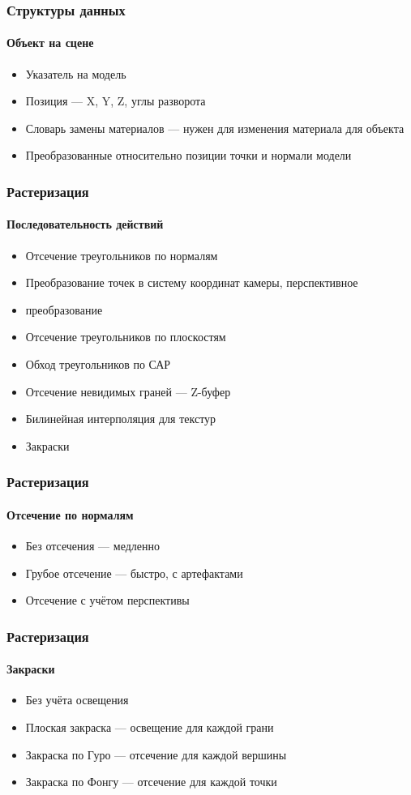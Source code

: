 \documentclass{beamer}
\begin{document}
\begin{frame}
\begin{frame}
\frametitle{Структуры данных}
\framesubtitle{Объект на сцене}

\begin{itemize}
\item Указатель на модель
\item Позиция --- X, Y, Z, углы разворота
\item Словарь замены материалов --- нужен для изменения материала для объекта
\item Преобразованные относительно позиции точки и нормали модели
\end{itemize}
\end{frame}

\begin{frame}
\frametitle{Растеризация}
\framesubtitle{Последовательность действий}

\begin{itemize}
\item Отсечение треугольников по нормалям
\item Преобразование точек в систему координат камеры, перспективное \item преобразование
\item Отсечение треугольников по плоскостям
\item Обход треугольников по САР
\item Отсечение невидимых граней --- Z-буфер
\item Билинейная интерполяция для текстур
\item Закраски
\end{itemize}
\end{frame}

\begin{frame}
\frametitle{Растеризация}
\framesubtitle{Отсечение по нормалям}

\begin{itemize}
\item Без отсечения --- медленно
\item Грубое отсечение --- быстро, с артефактами
\item Отсечение с учётом перспективы
\end{itemize}
\end{frame}

\begin{frame}
\frametitle{Растеризация}
\framesubtitle{Закраски}

\begin{itemize}
\item Без учёта освещения
\item Плоская закраска --- освещение для каждой грани
\item Закраска по Гуро --- отсечение для каждой вершины
\item Закраска по Фонгу --- отсечение для каждой точки
\end{itemize}
\end{frame}


\end{frame}
\end{document}
